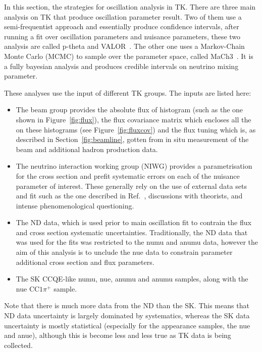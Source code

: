 

In this section, the strategies for oscillation analysis in \Gls{TK}.
There are three main analysis on \Gls{TK} that produce oscillation
parameter result. Two of them use a semi-frequentist approach and
essentially produce confidence intervals, after running a fit over
oscillation parameters and nuisance parameters, these two analysis are
called \gls{p-theta} and \Gls{VALOR}~\cite{VALOR}. The other one uses
a Markov-Chain Monte Carlo (\Gls{MCMC}) to sample over the parameter
space, called \Gls{MaCh3}~\cite{MACH3}. It is a fully bayesian
analysis and produces credible intervals on neutrino mixing parameter.

These analyses use the input of different \Gls{TK} groups. The inputs
are listed here:
\begin{itemize}
\item The beam group provides the absolute flux of histogram (such as
  the one shown in Figure~\ref{fig:flux}), the flux covariance matrix
  which encloses all the on these histograms (see
  Figure~\ref{fig:fluxcov}) and the flux tuning which is, as described
  in Section~\ref{fig:beamline}, gotten from in situ measurement of the
  beam and additional hadron production data.
\item The neutrino interaction working group (\Gls{NIWG}) provides a
  parametrisation for the cross section and prefit systematic errors
  on each of the nuisance parameter of interest. These generally rely
  on the use of external data sets and fit such as the one described
  in Ref.~\cite{CallumFit}, discussions with theorists, and intense
  phenomenological questioning.
\item The \Gls{ND} data, which is used prior to main oscillation fit
  to contrain the flux and cross section systematic
  uncertainties. Traditionally, the \Gls{ND} data that was used for
  the fits was restricted to the \Gls{numu} and \Gls{anumu} data,
  however the aim of this analysis is to unclude the \Gls{nue} data to
  constrain parameter additional cross section and flux parameters.
\item The \Gls{SK} \Gls{CCQE}-like \gls{numu}, \gls{nue}, \gls{anumu}
  and \gls{anumu} samples, along with the \Gls{nue} \Gls{CC}$1\pi^+$
  sample.
\end{itemize}

Note that there is much more data from the \Gls{ND} than the
\Gls{SK}. This means that \Gls{ND} data uncertainty is largely
dominated by systematics, whereas the \Gls{SK} data uncertainty is
mostly statistical (especially for the appearance samples, the
\gls{nue} and \gls{anue}), although this is become less and less true
as \Gls{TK} data is being collected.

